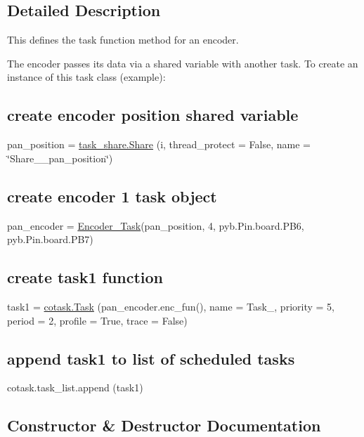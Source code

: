 \subsection{Detailed Description}
This defines the task function method for an encoder. 

The encoder passes its data via a shared variable with another task. To create an instance of this task class (example)\+: \subsection*{create encoder position shared variable}

pan\+\_\+position = \hyperlink{classtask__share_1_1Share}{task\+\_\+share.\+Share} (\textquotesingle{}i\textquotesingle{}, thread\+\_\+protect = False, name = \char`\"{}\+Share\+\_\+\_\+pan\+\_\+position\char`\"{}) \subsection*{create encoder 1 task object}

pan\+\_\+encoder = \hyperlink{classencoder__task__func_1_1Encoder__Task}{Encoder\+\_\+\+Task}(pan\+\_\+position, 4, pyb.\+Pin.\+board.\+P\+B6, pyb.\+Pin.\+board.\+P\+B7) \subsection*{create task1 function}

task1 = \hyperlink{classcotask_1_1Task}{cotask.\+Task} (pan\+\_\+encoder.\+enc\+\_\+fun(), name = \textquotesingle{}Task\+\_\textquotesingle{}, priority = 5, period = 2, profile = True, trace = False) \subsection*{append task1 to list of scheduled tasks}

cotask.\+task\+\_\+list.\+append (task1) 

\subsection{Constructor \& Destructor Documentation}

